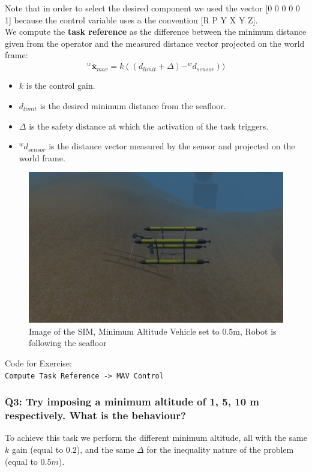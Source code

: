 \documentclass{article}
\begin{document}
Note that in order to select the desired component we used the vector [0 0 0 0 0 1] because the control variable uses a the convention [R P Y X Y Z].
\\
We compute the \textbf{task reference} as the difference between the minimum distance given from the operator and the measured distance vector projected on the world frame:
\begin{equation}
    ^{w}\dot{\overline{\boldsymbol{x}}}_{mav} = k((d_{limit}+\Delta)- ^w d_{sensor})) %
\end{equation}
\begin{itemize}
    \item $k$ is the control gain.
    \item $d_{limit}$ is the desired minimum distance from the seafloor.
    \item $ \Delta $ is the safety distance at which the activation of the task triggers.
    \item $^w d_{sensor}$ is the distance vector measured by the sensor and projected on the world frame.
\end{itemize} 

\begin{figure}[t]
    \centering
    \includegraphics[scale=0.4]{122_MAV1m.png}
    \caption{Image of the SIM, Minimum Altitude Vehicle set to 0.5m, Robot is following the seafloor}
    \label{images_2_1}
\end{figure}

\colorbox{mygray}{\parbox{0.9\textwidth}{Code for Exercise: \\
\texttt{Compute Task Reference -> MAV Control}\\
}}

\subsubsection{Q3: Try imposing a minimum altitude of 1, 5, 10 m respectively. What is the behaviour?}
To achieve this task we perform the different minimum altitude, all with the same $k$ gain (equal to $0.2$), and the same $\Delta$ for the inequality nature of the problem (equal to $0.5 m$).
\end{document}
